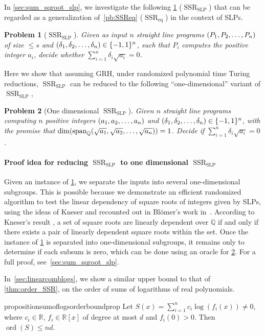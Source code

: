 \documentclass[a4paper, 11pt,dvipsnames]{article}
\newtheorem{problem}{Problem}
\DeclareMathOperator{\spn}{span}
\newcommand{\ord}{\operatorname{ord}}
\newcommand{\SSReq}{\operatorname{SSR}_{\operatorname{eq}}}
\newcommand{\SSRslp}{\operatorname{SSR}_{\operatorname{SLP}}}
\begin{document}
In \cref{sec:sum_sqroot_slp}, we investigate the following \cref{pb:SSRSLP} ($\SSRslp$) that can be regarded as a generalization of~\cref{pb:SSReq} ($\SSReq$) in the context of SLPs.
\begin{problem} [$\SSRslp$] 
\label{pb:SSRSLP} 
  Given as input $n$ straight line programs $(P_{1},P_{2},\dots,P_{n})$ of size $\le s$ and $(\delta_{1},\delta_{2},\dots,\delta_{n}) \in \{-1,1\}^n$, such that $P_i$ computes the positive integer $a_i$, decide whether $\sum_{i=1}^{n} \delta_i \sqrt{a_i} = 0$.  
\end{problem}

Here we show that assuming GRH, under randomized polynomial time Turing reductions, $\SSRslp$ can be reduced to the following ``one-dimensional'' variant of $\SSRslp$, 
\begin{problem} [One dimensional $\SSRslp$] \label{pb:1dimSSR} Given $n$ straight line programs computing $n$ positive integers $(a_{1},a_{2},\dots,a_{n})$ and $(\delta_{1},\delta_{2},\dots,\delta_{n}) \in \{-1,1\}^n$, with the promise that $\dim (\spn_{\mathbb{Q}}(\lsst a n)) = 1$.  Decide if $\sum_{i=1}^{n} \delta_i \sqrt{a_i} = 0$.
\end{problem}

\paragraph{Proof idea for reducing $\SSRslp$ to one dimensional $\SSRslp$}
Given an instance of \cref{pb:SSRSLP}, we separate the inputs into several one-dimensional subgroups. This is possible because we demonstrate an efficient randomized algorithm to test the linear dependency of square roots of integers given by SLPs, using the ideas of Kneser \cite{Kneser1975} and recounted out in Blömer's work in~\cite{blomer1993computing}. According to Kneser's result \cite{Kneser1975}, a set of square roots are linearly dependent over $\mathbb{Q}$ if and only if there exists a pair of linearly dependent square roots within the set. Once the instance of \cref{pb:SSRSLP} is separated into one-dimensional subgroups, it remains only to determine if each subsum is zero, which can be done using an oracle for \cref{pb:1dimSSR}. For a full proof, see~\cref{sec:sum_sqroot_slp}.

In~\cref{sec:linearcomblogs}, we show a similar upper bound to that of \cref{thm:order_SSR}, on the order of sums of logarithms of real polynomials. 
\begin{restatable}{proposition}{sumoflogsorderboundprop}
   Let $S(x) = \sum_{i=1}^n c_i  \log(f_i(x)) \neq 0$, where $c_i \in \mathbb{R}$, $f_i \in \mathbb{R}[x]$  of degree at most $d$ and $f_i(0) > 0$. Then $ \ord(S) \le nd$.  \label{prop:log} 
\end{restatable}
\end{document}
